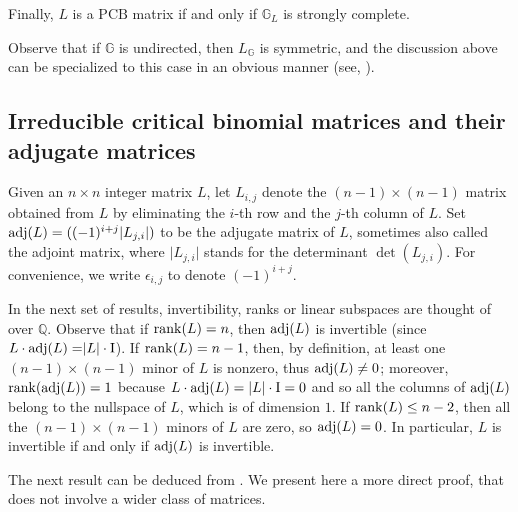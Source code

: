 \documentclass[ALCO]{cedram}
\newcommand{\mbq}{\mbox{$\mathbb{Q}$}}
\newcommand{\mbg}{\mbox{$\mathbb{G}$}}
\newcommand{\pcb}{\mbox{$\mathrm{PCB}$}}
\newcommand{\I}{\mbox{${\rm I}$}}
\newcommand{\rank}{\mbox{${\rm rank}$}}
\newcommand{\adj}{\mbox{${\rm adj}$}}
\begin{document}
Finally, $L$ is a $\pcb$ matrix if and only if $\mbg_L$ is strongly
complete.

Observe that if $\mbg$ is undirected, then $L_{\mathbb{G}}$ is
symmetric, and the discussion above can be specialized to this case in
an obvious manner (see, \eg \cite{ms}).

\vspace{-.25em}

\subsection{Irreducible critical binomial matrices and their adjugate 
matrices}\label{ibm-adj} %

 Given an $n\times n$ integer matrix $L$, let $L_{i,j}$
denote the $(n-1)\times (n-1)$ matrix obtained from $L$ by eliminating
the $i$-th row and the $j$-th column of $L$. Set $\adj(L)=
((-1)^{i+j}\lvert L_{j,i}\rvert)$ to be the adjugate matrix of $L$,
sometimes also called the adjoint matrix, where $\lvert L_{j,i}\rvert$
stands for the determinant $\det(L_{j,i})$. For convenience, we write
$\epsilon_{i,j}$ to denote $(-1)^{i+j}$.

In the next set of results, invertibility, ranks or linear subspaces
are thought of over $\mbq$. Observe that if $\rank(L)=n$, then
$\adj(L)$ is invertible (since $L\cdot \adj(L)=\rvert
L\rvert\cdot\I$). If $\rank(L)=n-1$, then, by definition, at least
one $(n-1)\times (n-1)$ minor of $L$ is nonzero, thus $\adj(L)\neq 0$;
moreover, $\rank(\adj(L))=1$ because $L\cdot \adj(L)=\lvert
L\rvert\cdot \I=0$ and so all the columns of $\adj(L)$ belong to the
nullspace of $L$, which is of dimension $1$. If $\rank(L)\leq n-2$,
then all the $(n-1)\times (n-1)$ minors of $L$ are zero, so
$\adj(L)=0$. In particular, $L$ is invertible if and only if $\adj(L)$
is invertible.

The next result can be deduced from \cite[Theorem~7.6]{opv}. We
present here a more direct proof, that does not involve a wider class
of matrices. 
\end{document}
